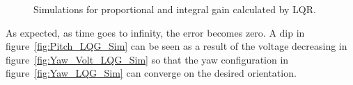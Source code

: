 \begin{figure}[!htbp]
    \centering
    \caption{Simulations for proportional and integral gain calculated by LQR.}
\end{figure}
As expected, as time goes to infinity, the error becomes zero.  A dip in figure~\ref{fig:Pitch_LQG_Sim} can be seen as a result of the voltage decreasing in figure~\ref{fig:Yaw_Volt_LQG_Sim} so that the yaw configuration in figure~\ref{fig:Yaw_LQG_Sim} can converge on the desired orientation.

